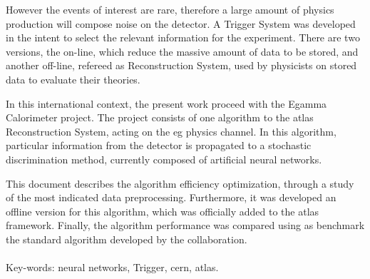 However the events of interest are rare, therefore a large amount of physics
production will compose noise on the detector. A Trigger System was developed in the
intent to select the relevant information for the experiment. There are two
versions, the on-line, which reduce the massive amount of data
to be stored, and another off-line, refereed as Reconstruction System, used by 
physicists on stored data to evaluate their theories.

In this international context, the present work proceed with the Egamma
Calorimeter project. The project consists of one algorithm to the
\gls{atlas} Reconstruction System, acting on the \acrshort{eg} physics channel. In this
algorithm, particular information from the detector is propagated to a stochastic
discrimination method, currently composed of artificial neural networks.

This document describes the algorithm efficiency optimization, through a study
of the most indicated data preprocessing. Furthermore, it was developed an
offline version for this algorithm, which was officially added to the
\gls{atlas} framework. Finally, the algorithm performance was compared using as benchmark
the standard algorithm developed by the collaboration.


\paragraph*{}

\noindent Key-words: neural networks, Trigger, \acrshort{cern}, \acrshort{atlas}.


\vfill
